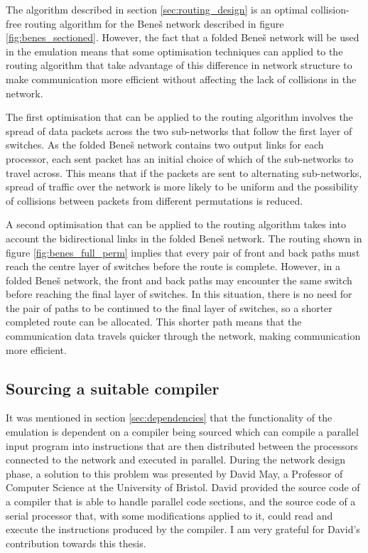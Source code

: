 \documentclass[a4paper, 12pt]{article}
\begin{document}
The algorithm described in section \ref{sec:routing_design} is an optimal collision-free routing algorithm for the Bene\v{s} network described in figure \ref{fig:benes_sectioned}. However, the fact that a folded Bene\v{s} network will be used in the emulation means that some optimisation techniques can applied to the routing algorithm that take advantage of this difference in network structure to make communication more efficient without affecting the lack of collisions in the network.

The first optimisation that can be applied to the routing algorithm involves the spread of data packets across the two sub-networks that follow the first layer of switches. As the folded Bene\v{s} network contains two output links for each processor, each sent packet has an initial choice of which of the sub-networks to travel across. This means that if the packets are sent to alternating sub-networks, spread of traffic over the network is more likely to be uniform and the possibility of collisions between packets from different permutations is reduced.

A second optimisation that can be applied to the routing algorithm takes into account the bidirectional links in the folded Bene\v{s} network. The routing shown in figure \ref{fig:benes_full_perm} implies that every pair of front and back paths must reach the centre layer of switches before the route is complete. However, in a folded Bene\v{s} network, the front and back paths may encounter the same switch before reaching the final layer of switches. In this situation, there is no need for the pair of paths to be continued to the final layer of switches, so a shorter completed route can be allocated. This shorter path means that the communication data travels quicker through the network, making communication more efficient.

\subsection{Sourcing a suitable compiler}

It was mentioned in section \ref{sec:dependencies} that the functionality of the emulation is dependent on a compiler being sourced which can compile a parallel input program into instructions that are then distributed between the processors connected to the network and executed in parallel. During the network design phase, a solution to this problem was presented by David May, a Professor of Computer Science at the University of Bristol. David provided the source code of a compiler that is able to handle parallel code sections, and the source code of a serial processor that, with some modifications applied to it, could read and execute the instructions produced by the compiler. I am very grateful for David's contribution towards this thesis.
\end{document}
